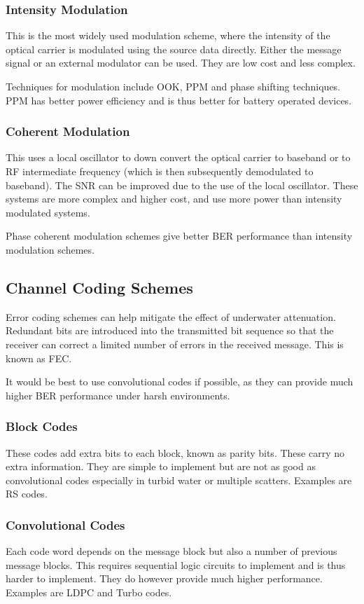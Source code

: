 \documentclass{article}
\begin{document}
\subsubsection{Intensity Modulation}
This is the most widely used modulation scheme, where the intensity of the optical carrier is modulated using the source data directly. Either the message signal or an external modulator can be used. They are low cost and less complex.

Techniques for modulation include \ac{OOK}, \ac{PPM} and phase shifting techniques. \ac{PPM} has better power efficiency and is thus better for battery operated devices.

\subsubsection{Coherent Modulation}
This uses a local oscillator to down convert the optical carrier to baseband or to \ac{RF} intermediate frequency (which is then subsequently demodulated to baseband). The \ac{SNR} can be improved due to the use of the local oscillator. These systems are more complex and higher cost, and use more power than intensity modulated systems.

Phase coherent modulation schemes give better \ac{BER} performance than intensity modulation schemes.

\subsection{Channel Coding Schemes}
Error coding schemes can help mitigate the effect of underwater attenuation. Redundant bits are introduced into the transmitted bit sequence so that the receiver can correct a limited number of errors in the received message. This is known as \ac{FEC}.

It would be best to use convolutional codes if possible, as they can provide much higher \ac{BER} performance under harsh environments.

\subsubsection{Block Codes}
These codes add extra bits to each block, known as parity bits. These carry no extra information. They are simple to implement but are not as good as convolutional codes especially in turbid water or multiple scatters. Examples are \ac{RS} codes.

\subsubsection{Convolutional Codes}
Each code word depends on the message block but also a number of previous message blocks. This requires sequential logic circuits to implement and is thus harder to implement. They do however provide much higher performance. Examples are \ac{LDPC} and Turbo codes.
\end{document}
